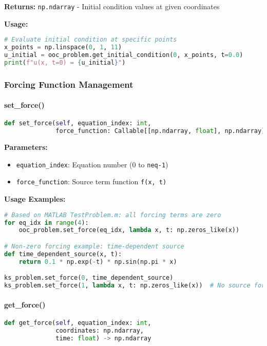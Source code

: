 \textbf{Returns:} \texttt{np.ndarray} - Initial condition values at given coordinates

\textbf{Usage:}
\begin{lstlisting}[language=Python]
# Evaluate initial condition at specific points
x_points = np.linspace(0, 1, 11)
u_initial = ooc_problem.get_initial_condition(0, x_points, t=0.0)
print(f"u(x, t=0) = {u_initial}")
\end{lstlisting}

\subsubsection{Forcing Function Management}

\paragraph{set\_force()}
\begin{lstlisting}[language=Python, caption=Set Force Method]
def set_force(self, equation_index: int,
              force_function: Callable[[np.ndarray, float], np.ndarray])
\end{lstlisting}

\textbf{Parameters:}
\begin{itemize}
    \item \texttt{equation\_index}: Equation number (0 to \texttt{neq-1})
    \item \texttt{force\_function}: Source term function \texttt{f(x, t)}
\end{itemize}

\textbf{Usage Examples:}
\begin{lstlisting}[language=Python, caption=Forcing Function Examples]
# Based on MATLAB TestProblem.m: all forcing terms are zero
for eq_idx in range(4):
    ooc_problem.set_force(eq_idx, lambda x, t: np.zeros_like(x))

# Non-zero forcing example: time-dependent source
def time_dependent_source(x, t):
    return 0.1 * np.exp(-t) * np.sin(np.pi * x)

ks_problem.set_force(0, time_dependent_source)
ks_problem.set_force(1, lambda x, t: np.zeros_like(x))  # No source for phi
\end{lstlisting}

\paragraph{get\_force()}
\begin{lstlisting}[language=Python, caption=Get Force Method]
def get_force(self, equation_index: int,
              coordinates: np.ndarray,
              time: float) -> np.ndarray
\end{lstlisting}

